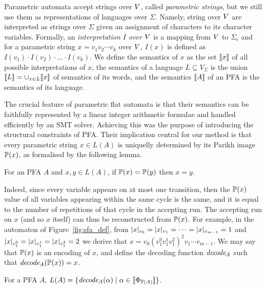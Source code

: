 \documentclass[sigplan,review,anonymous]{acmart}\settopmatter{printfolios=true,printccs=false,printacmref=false}
\begin{document}
Parametric automata accept strings over $V$, called \emph{parametric strings}, but we still use them as representations of languages over $\Sigma$. 
%
Namely, string over $V$ are interpreted as strings over $\Sigma$ given an assignment of characters to its character variables.  
%
Formally, an \emph{interpretation $I$ over $V$} is a mapping from $V$ to $\Sigma_\epsilon$ and for a parametric string $x= v_1v_2\cdots v_k$ over $V$, $I(x)$ is defined as $I(v_1)\cdot I(v_2)\cdot \ldots \cdot I(v_k)$.
%
We define the semantics of $x$ as the set $[\![x]\!]$ of all possible interpretations of $x$, the semantics of a language $L\subseteq V_\Sigma$ is the union $[\![L]\!] = \cup_{x\in L} [\![x]\!]$ of semantics of its words, and the semantics $[\![A]\!]$ of an PFA is the semantics of its language. 

The crucial feature of parametric flat automata is that their semantics can be faithfully represented by a linear integer arithmetic formulae and handled efficiently by an SMT solver. 
%
Achieving this was the purpose of introducing the structural constraints of PFA. 
Their implication central for our method is that every parametric string $x\in L(A)$ is uniquelly determined by its Parikh image $\mathbb{P}{(x)}$, as formalised by the following lemma.  

\begin{lemma}\label{lemma:parikh}
For an PFA $A$ and $x,y\in L(A)$, if $\mathbb{P}{(x)} = \mathbb{P}{(y)}$ then $x = y$. 
\end{lemma}
%
Indeed, since every variable appears on at most one transition, then the $\mathbb{P}{(x)}$ value of all variables appearing within the same cycle is the same, and it is equal to the number of repetitions of that cycle in the accepting run. 
%
The accepting run on $x$ (and so $x$ itself) can thus be reconstructed from $\mathbb{P}{(x)}$. 
%
For example, in the automaton of Figure~\ref{fig:sfa_def}, 
from $|x|_{v_0} = |x|_{v_1} = \cdots = |x|_{v_{m-1}}=1$ and $|x|_{v^0_1}=|x|_{v^1_1}=|x|_{v^2_1}=2$ we derive that $x=v_0(v^0_1v^1_1v^2_1)^2v_1\cdots v_{m-1}$. 
We may say that $\mathbb{P}{(x)}$ is an encoding of $x$, and define the decoding function $\mathit{decode_{A}}$ such that $\mathit{decode_{A}}(\mathbb{P}{(x)}) = x$.

\begin{lemma}\label{lemma:decx}
For a PFA $A$, $L(A) = \{\mathit{decode_{A}}(\alpha) \mid \alpha\in[\![\Phi_{\mathbb{P}{(A)}}]\!]\}$.
\end{lemma}
\end{document}
